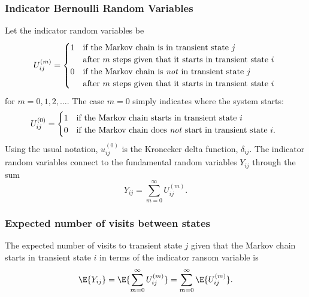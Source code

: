 \documentclass[12pt]{article}
\begin{document}
\subsubsection*{Indicator Bernoulli Random Variables}

Let the indicator random variables be
\[
    U_{ij}^{(m)} =
    \begin{cases}
        1 & \text{if the Markov chain is in transient state \(j\)} \\
          & \text{after \(m\) steps given that it starts in transient state \(i\) } \\
        0 & \text{if the Markov chain is \emph{not} in transient state
          \(j\) } \\
          & \text{after \(m\) steps given that it starts in transient state \(i\)}
    \end{cases}
\] for \( m = 0, 1,2, \dots \).  The case \( m = 0 \) simply indicates
where the system starts:
\[
    U_{ij}^{(0)} =
    \begin{cases}
        1 & \text{if the Markov chain starts in transient state \(i\) }
        \\
        0 & \text{if the Markov chain does \emph{not} start in transient
        state \(i\). }
    \end{cases}
\] Using the usual notation, \( u_{ij}^{(0)} \) is the Kronecker delta function, \(
\delta_{ij} \).  The indicator random variables connect to the
fundamental random variables \( Y_{ij} \) through the sum
\[
    Y_{ij} = \sum\limits_{m=0}^{\infty} U_{ij}^{(m)}.
\]

\subsubsection*{Expected number of visits between states}

The expected number of visits to transient state \( j \) given that the
Markov chain starts in transient state \( i \) in terms of the indicator
ransom variable is
\[
    \E{Y_{ij}} = \E{\sum\limits_{m=0}^{\infty} U_{ij}^{(m)} } = \sum\limits_
    {m=0}^{\infty} \E{U_{ij}^{(m)}}.
\]
\end{document}
